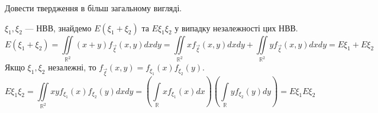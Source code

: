 \begin{exercise}
    Довести твердження в більш загальному вигляді.
\end{exercise}

\begin{example}\label{proof:expectation}
    $\xi_1, \xi_2$ --- НВВ, знайдемо $E(\xi_1 + \xi_2)$ та $E\xi_1\xi_2$
    у випадку незалежності цих НВВ.
    $$E(\xi_1 + \xi_2) = \iint\limits_{\mathbb{R}^2} (x+y) f_{\vec{\xi}}(x,y) dx dy = 
    \iint\limits_{\mathbb{R}^2} x f_{\vec{\xi}}(x,y) dx dy + 
    \iint\limits_{\mathbb{R}^2} y f_{\vec{\xi}}(x,y) dx dy = E\xi_1 + E\xi_2$$
    Якщо $\xi_1, \xi_2$ незалежні, то $f_{\vec{\xi}}(x,y) = f_{\xi_1}(x) f_{\xi_2}(y)$.
    $$E\xi_1 \xi_2 =
    \iint\limits_{\mathbb{R}^2} xy f_{\xi_1}(x) f_{\xi_2}(y) dx dy =
    \left( \int\limits_{\mathbb{R}} x f_{\xi_1}(x) dx \right)
    \left( \int\limits_{\mathbb{R}} y f_{\xi_2}(y) dy \right) = E\xi_1 E\xi_2$$
\end{example}
